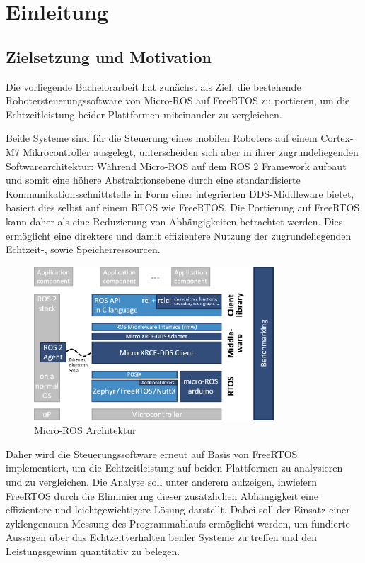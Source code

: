 \section{Einleitung}

\subsection{Zielsetzung und Motivation}

Die vorliegende Bachelorarbeit hat zunächst als Ziel, die bestehende
Robotersteuerungssoftware von Micro-ROS auf FreeRTOS zu portieren, um die
Echtzeitleistung beider Plattformen miteinander zu vergleichen.

Beide Systeme sind für die Steuerung eines mobilen Roboters auf einem Cortex-M7
Mikrocontroller ausgelegt, unterscheiden sich aber in ihrer zugrundeliegenden
Softwarearchitektur: Während Micro-ROS auf dem \ac{ROS 2} Framework aufbaut und
somit eine höhere Abstraktionsebene durch eine standardisierte
Kommunikationsschnittstelle in Form einer integrierten \ac{DDS}-Middleware
bietet, basiert dies selbst auf einem \ac{RTOS} wie FreeRTOS. Die Portierung auf
FreeRTOS kann daher als eine Reduzierung von Abhängigkeiten betrachtet werden.
Dies ermöglicht eine direktere und damit effizientere Nutzung der
zugrundeliegenden Echtzeit-, sowie Speicherressourcen.

\begin{figure}[htb] \centering
    \includegraphics[width=0.8\textwidth]{assets/Micro-ROS_architecture}
    \caption{Micro-ROS Architektur\cite[S. 6]{koubaa2023}}
\end{figure}

Daher wird die Steuerungssoftware erneut auf Basis von FreeRTOS implementiert,
um die Echtzeitleistung auf beiden Plattformen zu analysieren und zu
vergleichen. Die Analyse soll unter anderem aufzeigen, inwiefern FreeRTOS durch
die Eliminierung dieser zusätzlichen Abhängigkeit eine effizientere und
leichtgewichtigere Lösung darstellt. Dabei soll der Einsatz einer zyklengenauen
Messung des Programmablaufs ermöglicht werden, um fundierte Aussagen über das
Echtzeitverhalten beider Systeme zu treffen und den Leistungsgewinn quantitativ
zu belegen.


